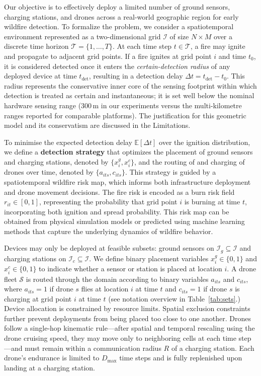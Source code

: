 \documentclass{article}
\newcommand{\set}[1]{\mathcal{#1}}
\begin{document}
Our objective is to effectively deploy a limited number of ground sensors, charging stations, and drones across a real-world geographic region for early wildfire detection. To formalize the problem, we consider a spatiotemporal environment represented as a two-dimensional grid $\mathcal{I}$ of size $N \times M$ over a discrete time horizon $\set T = \{1, \dots, T\}$. At each time step $t \in \set T$, a fire may ignite and propagate to adjacent grid points. If a fire ignites at grid point $i$ and time $t_0$, it is considered detected once it enters the \emph{certain-detection radius} of any deployed device at time $t_\text{det}$, resulting in a detection delay $\Delta t = t_\text{det} - t_0$. This radius represents the conservative inner core of the sensing footprint within which detection is treated as certain and instantaneous; it is set well below the nominal hardware sensing range (300\,m in our experiments versus the multi-kilometre ranges reported for comparable platforms). The justification for this geometric model and its conservatism are discussed in the Limitations.

To minimise the expected detection delay $\mathbb{E}[\Delta t]$ over the ignition distribution, we define a \textbf{detection strategy} that optimizes the placement of ground sensors and charging stations, denoted by $\{x_i^g, x_i^c\}$, and the routing of and charging of drones over time, denoted by $\{a_{its}, c_{its}\}$. This strategy is guided by a spatiotemporal wildfire risk map, which informs both infrastructure deployment and drone movement decisions. The fire risk is encoded as a burn risk field $r_{it} \in [0,1]$, representing the probability that grid point $i$ is burning at time $t$, incorporating both ignition and spread probability. This risk map can be obtained from physical simulation models or predicted using machine learning methods that capture the underlying dynamics of wildfire behavior.

Devices may only be deployed at feasible subsets: ground sensors on $\set I_g \subseteq \set I$ and charging stations on $\set I_c \subseteq \set I$. We define binary placement variables $x_i^g \in \{0,1\}$ and $x_i^c \in \{0,1\}$ to indicate whether a sensor or station is placed at location $i$. A drone fleet $\set S$ is routed through the domain according to binary variables $a_{its}$ and $c_{its}$, where $a_{its} = 1$ if drone $s$ flies at location $i$ at time $t$ and $c_{its} = 1$ if drone $s$ is charging at grid point $i$ at time $t$ (see notation overview in Table~\ref{tab:sets}.) Device allocation is constrained by resource limits. Spatial exclusion constraints further prevent deployments from being placed too close to one another. Drones follow a single-hop kinematic rule—after spatial and temporal rescaling using the drone cruising speed, they may move only to neighboring cells at each time step—and must remain within a communication radius $R$ of a charging station. Each drone’s endurance is limited to $D_{\max}$ time steps and is fully replenished upon landing at a charging station.
\end{document}
